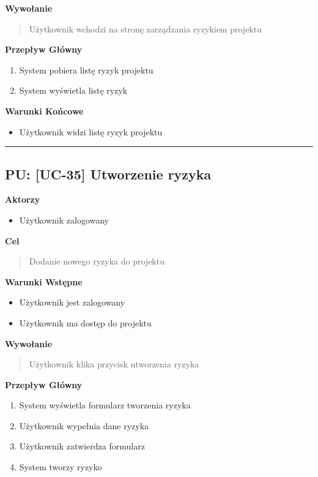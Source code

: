 \vspace{0.2cm}
\noindent\textbf{Wywołanie}
\begin{quote}
    Użytkownik wchodzi na stronę zarządzania ryzykiem projektu
\end{quote}

\vspace{0.2cm}
\noindent\textbf{Przepływ Główny}
\begin{enumerate}
    \item System pobiera listę ryzyk projektu
    \item System wyświetla listę ryzyk
\end{enumerate}

\vspace{0.2cm}
\noindent\textbf{Warunki Końcowe}
\begin{itemize}
    \item Użytkownik widzi listę ryzyk projektu
\end{itemize}


\hrule
\vspace{1cm}

\subsection*{PU: [UC-35] Utworzenie ryzyka}

\noindent\textbf{Aktorzy}
\begin{itemize}
    \item Użytkownik zalogowany
\end{itemize}

\vspace{0.2cm}
\noindent\textbf{Cel}
\begin{quote}
    Dodanie nowego ryzyka do projektu
\end{quote}

\vspace{0.2cm}
\noindent\textbf{Warunki Wstępne}
\begin{itemize}
    \item Użytkownik jest zalogowany
    \item Użytkownik ma dostęp do projektu
\end{itemize}

\vspace{0.2cm}
\noindent\textbf{Wywołanie}
\begin{quote}
    Użytkownik klika przycisk utworzenia ryzyka
\end{quote}

\vspace{0.2cm}
\noindent\textbf{Przepływ Główny}
\begin{enumerate}
    \item System wyświetla formularz tworzenia ryzyka
    \item Użytkownik wypełnia dane ryzyka
    \item Użytkownik zatwierdza formularz
    \item System tworzy ryzyko
\end{enumerate}

